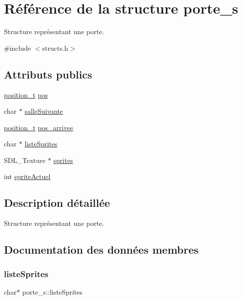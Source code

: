 \hypertarget{structporte__s}{}\section{Référence de la structure porte\+\_\+s}
\label{structporte__s}


Structure représentant une porte.  




{\ttfamily \#include $<$structs.\+h$>$}

\subsection*{Attributs publics}
\begin{DoxyCompactItemize}
\item 
\hyperlink{structposition__s}{position\+\_\+t} \hyperlink{structporte__s_a9e3c1bbfc207fb5ae26ed3c348ae9602}{pos}
\item 
char $\ast$ \hyperlink{structporte__s_ae89eb735de3e232b85236a603bf004d4}{salle\+Suivante}
\item 
\hyperlink{structposition__s}{position\+\_\+t} \hyperlink{structporte__s_a5f0b093b4c08255187a3dd261ff9e638}{pos\+\_\+arrivee}
\item 
char $\ast$ \hyperlink{structporte__s_aa55e29e3a22ae8711ea6ff4de335feee}{liste\+Sprites}
\item 
S\+D\+L\+\_\+\+Texture $\ast$ \hyperlink{structporte__s_ac2c6fbd516cc31f3b68f29541f4fff06}{sprites}
\item 
int \hyperlink{structporte__s_af7204aec8f2a5b1641986d70aa74e077}{sprite\+Actuel}
\end{DoxyCompactItemize}


\subsection{Description détaillée}
Structure représentant une porte. 

\subsection{Documentation des données membres}
\mbox{\label{structporte__s_aa55e29e3a22ae8711ea6ff4de335feee}} 
\subsubsection{\texorpdfstring{liste\+Sprites}{listeSprites}}
{\footnotesize\ttfamily char$\ast$ porte\+\_\+s\+::liste\+Sprites}

